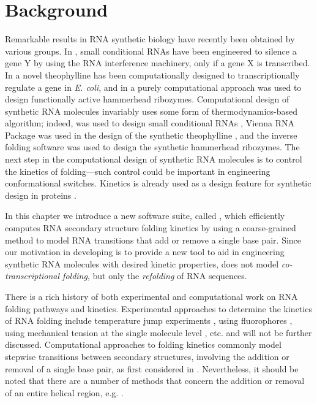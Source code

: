 \section{Background}
\label{sec:hermes:bkgrnd}

Remarkable results in RNA synthetic biology have recently been
obtained by various groups. In \citep{hochrein.jacs13}, small
conditional RNAs have been engineered to silence a gene Y by using the
RNA interference machinery, only if a gene X is transcribed. In
\citep{wachsmuth.nar13} a novel theophylline \rb has been
computationally designed to transcriptionally regulate a gene in
{\em E. coli}, and in \citep{synthetichammerheads} a purely computational
approach was used to design functionally active hammerhead ribozymes.
Computational design of synthetic RNA molecules invariably uses some
form of thermodynamics-based algorithm; indeed, 
\citep{zadeh.jcc11} was used to design small conditional RNAs
\citep{hochrein.jacs13}, Vienna RNA Package \citep{gruber08} was used in
the design of the synthetic theophylline \rb, and the
 inverse folding software
\citep{garcia.jbcbb13,garciamartin.nar13} was used to design the
synthetic hammerhead ribozymes. The next step in the computational
design of synthetic RNA molecules is to control the kinetics of
folding---such control could be important in engineering
conformational switches. Kinetics is already used as a design feature
for synthetic design in proteins \citep{bujotzek.jcam11,fasting.acie12}.

In this chapter we introduce a new software suite, called \hermes
\citep{senter:2015fq},
which efficiently computes RNA secondary structure
folding kinetics by using a coarse-grained
method to model RNA transitions that add or remove a single base pair.
Since our motivation in developing \hermes is to provide a new
tool to aid in engineering synthetic RNA molecules with desired
kinetic properties, \hermes does not model {\em co-transcriptional
folding}, but only the {\em refolding} of RNA sequences.

There is a rich history of both experimental and computational work on
RNA folding pathways and kinetics. Experimental approaches to
determine the kinetics of RNA folding include temperature jump
experiments \citep{lecuyercrothers}, using fluorophores
\citep{hobartner.jmb03}, using mechanical tension at the single
molecule level \citep{vieregg.mp06}, etc. and will not be further
discussed. Computational approaches to folding kinetics commonly model
stepwise transitions between secondary structures,
involving the addition or removal of a single base
pair, as first considered in \citep{flammhofacker}.
Nevertheless, it should be noted that there are a number of
methods that concern the addition or removal of an entire helical
region, e.g. \citep{huang.bb14,zhao.jcp11}.

